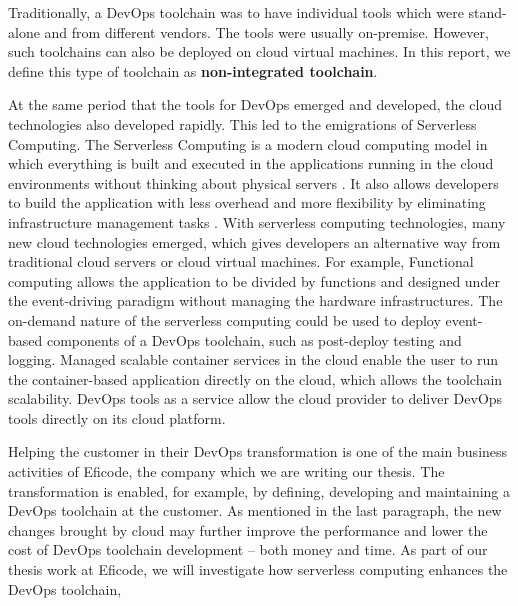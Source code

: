 \par
Traditionally, a DevOps toolchain was to have individual tools which were stand-alone and from different vendors. The tools were usually on-premise. However, such toolchains can also be deployed on cloud virtual machines. In this report, we define this type of toolchain as \textbf{non-integrated toolchain}.
\par
At the same period that the tools for DevOps emerged and developed, the cloud technologies also developed rapidly. This led to the emigrations of Serverless Computing. 
The Serverless Computing is a modern cloud computing model in which everything is built and executed in the applications running in the cloud environments without thinking about physical servers \cite{Serverle81:online}. It also allows developers to build the application with less overhead \cite{Serverle81:online} and more flexibility by eliminating infrastructure management tasks \cite{Serverle73:online}.
With serverless computing technologies, many new cloud technologies emerged, which gives developers an alternative way from traditional cloud servers or cloud virtual machines. For example, Functional computing allows the application to be divided by functions and designed under the event-driving paradigm without managing the hardware infrastructures. The on-demand nature of the serverless computing could be used to deploy event-based components of a DevOps toolchain, such as post-deploy testing and logging.
Managed scalable container services in the cloud enable the user to run the container-based application directly on the cloud, which allows the toolchain scalability. DevOps tools as a service \cite{DevOpsas45:online} allow the cloud provider to deliver DevOps tools directly on its cloud platform.
\par
Helping the customer in their DevOps transformation is one of the main business activities of Eficode, the company which we are writing our thesis. The transformation is enabled, for example, by defining, developing and maintaining a DevOps toolchain at the customer. As mentioned in the last paragraph, the new changes brought by cloud may further improve the performance and lower the cost of DevOps toolchain development -- both money and time. As part of our thesis work at Eficode, we will investigate how serverless computing enhances the DevOps toolchain,
